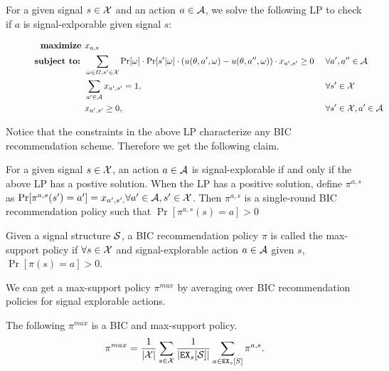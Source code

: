 For a given signal $s \in \X$ and an action $a \in \A$, we solve the following LP to check if $a$ is signal-exlporable given signal $s$:

\begin{figure}[H]
\begin{mdframed}
\begin{alignat*}{2}
  \textbf{maximize }   & x_{a,s}\  \\
  \textbf{subject to: } & \sum_{\omega \in \varOmega, s' \in \X} \Pr[\omega] \cdot \Pr[s' | \omega] \cdot \left(u(\theta, a', \omega) - u(\theta, a'', \omega)\right) \cdot x_{a',s'} \geq 0   &\ & \forall a',a'' \in \A \\
                       & \sum_{a'\in \A} x_{a',s'} = 1,  \ &\ & \forall s' \in \X \\
                       & x_{a',s'} \geq 0,  \ &\ & \forall s' \in \X, a'\in \A \\
\end{alignat*}
\end{mdframed}
\label{fig:public_lp}
\end{figure}

Notice that the constraints in the above LP characterize any BIC recommendation scheme. Therefore we get the following claim.
\begin{claim}
For a given signal $s \in \X$, an action $a \in \A$ is signal-explorable if and only if the above LP has a postive solution. When the LP has a positive solution, define $\pi^{a,s}$ as $\Pr[\pi^{a,s}(s') = a'] = x_{a',s', } \forall a' \in \A, s' \in \X$. Then $\pi^{a,s}$ is a single-round BIC recommendation policy such that $\Pr[\pi^{a,s}(s) = a] > 0$
\end{claim}

\begin{definition}
Given a signal structure $\S$, a BIC recommendation policy $\pi$ is called the max-support policy if $\forall s \in \X$  and signal-explorable action $a\in \A$ given $s$, $\Pr[\pi(s) = a] > 0$.
\end{definition}


We can get a max-support policy $\pi^{max}$ by averaging over BIC recommendation policies for signal explorable actions.
\begin{claim}
\label{clm:pimax}
The following $\pi^{max}$ is a BIC and max-support policy.
\[
\pi^{max} = \frac{1}{|\X|} \sum_{s \in \X} \frac{1}{|\EX_s[\S]|} \sum_{a \in \EX_s[S]} \pi^{a,s}.
\]
\end{claim}

